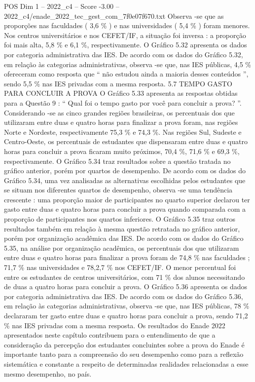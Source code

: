 \begin{textsample}{POS Dim 1 – 2022\_c4 – Score -3.00 – 2022\_c4/enade\_2022\_tec\_gest\_com\_7f0e07f670.txt}
Observa -se que as proporções nas faculdades ( 3,6 \% ) e nas universidades ( 5,4 \% ) foram menores.
Nos centros universitários e nos CEFET/IF, a situação foi inversa : a proporção foi mais alta, 5,8 \% e 6,1 \%, respectivamente.
O Gráfico 5.32 apresenta os dados por categoria administrativa das IES.
De acordo com os dados do Gráfico 5.32, em relação às categorias administrativas, observa -se que, nas IES públicas, 4,5 \% ofereceram como resposta que “ não estudou ainda a maioria desses conteúdos ”, sendo 5,5 \% nas IES privadas com a mesma resposta. 5.7 TEMPO GASTO PARA CONCLUIR A PROVA O Gráfico 5.33 apresenta as respostas obtidas para a Questão 9 : “ Qual foi o tempo gasto por você para concluir a prova? ”.
Considerando -se as cinco grandes regiões brasileiras, os percentuais dos que utilizaram entre duas e quatro horas para finalizar a prova foram, nas regiões Norte e Nordeste, respectivamente 75,3 \% e 74,3 \%.
Nas regiões Sul, Sudeste e Centro-Oeste, os percentuais de estudantes que dispensaram entre duas e quatro horas para concluir a prova ficaram muito próximos, 70,4 \%, 71,6 \% e 69,3 \%, respectivamente.
O Gráfico 5.34 traz resultados sobre a questão tratada no gráfico anterior, porém por quartos de desempenho.
De acordo com os dados do Gráfico 5.34, uma vez analisadas as alternativas escolhidas pelos estudantes que se situam nos diferentes quartos de desempenho, observa -se uma tendência crescente : uma proporção maior de participantes no quarto superior declarou ter gasto entre duas e quatro horas para concluir a prova quando comparada com a proporção de participantes nos quartos inferiores.
O Gráfico 5.35 traz outros resultados também em relação à mesma questão retratada no gráfico anterior, porém por organização acadêmica das IES.
De acordo com os dados do Gráfico 5.35, na análise por organização acadêmica, os percentuais dos que utilizaram entre duas e quatro horas para finalizar a prova foram de 74,8 \% nas faculdades ; 71,7 \% nas universidades e 78,2,7 \% nos CEFET/IF.
O menor percentual foi entre os estudantes de centros universitários, com 71 \% dos alunos necessitando de duas a quatro horas para concluir a prova.
O Gráfico 5.36 apresenta os dados por categoria administrativa das IES.
De acordo com os dados do Gráfico 5.36, em relação às categorias administrativas, observa -se que, nas IES públicas, 78 \% declararam ter gasto entre duas e quatro horas para concluir a prova, sendo 71,2 \% nas IES privadas com a mesma resposta.
Os resultados do Enade 2022 apresentados neste capítulo contribuem para o entendimento de que a consideração da percepção dos estudantes concluintes sobre a prova do Enade é importante tanto para a compreensão do seu desempenho como para a reflexão sistemática e constante a respeito de determinadas realidades relacionadas a esse mesmo desempenho, no país.

\end{textsample}
